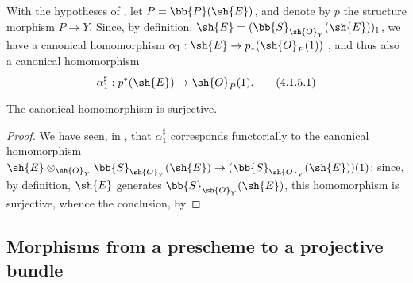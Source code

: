 \begin{env}[4.1.5]
\label{II.4.1.5}
With the hypotheses of , let $P=\bb{P}(\sh{E})$, and denote by $p$ the structure morphism $P\to Y$.
Since, by definition, $\sh{E}=(\bb{S}_{\sh{O}_Y}(\sh{E}))_1$, we have a canonical homomorphism $\alpha_1:\sh{E}\to p_*(\sh{O}_P(1))$ , and thus  also a canonical homomorphism
\[
\label{II.4.1.5.1}
  \alpha_1^\sharp: p^*(\sh{E}) \to \sh{O}_P(1).
  \tag{4.1.5.1}
\]
\end{env}

\begin{proposition}[4.1.6]
\label{II.4.1.6}
The canonical homomorphism  is surjective.
\end{proposition}

\begin{proof}
We have seen, in , that $\alpha_1^\sharp$ corresponds functorially to the canonical homomorphism $\sh{E}\otimes_{\sh{O}_Y}\bb{S}_{\sh{O}_Y}(\sh{E}) \to (\bb{S}_{\sh{O}_Y}(\sh{E}))(1)$;
since, by definition, $\sh{E}$ generates $\bb{S}_{\sh{O}_Y}(\sh{E})$, this homomorphism is surjective, whence the conclusion, by 
\end{proof}


\subsection{Morphisms from a prescheme to a projective bundle}
\label{subsection:II.4.2}

